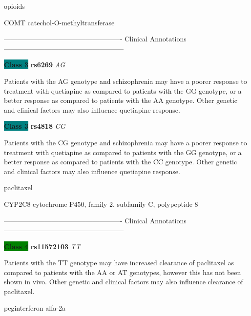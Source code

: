 \documentclass{resume} %
\begin{document}
\begin{rSection}{ opioids }
\begin{rSubsection}{ COMT }{ catechol-O-methyltransferase }{}{}
\item[] ---------------------------------------------------- Clinical Annotations -----------------------------------------------------\newline
\item \textbf{\colorbox{teal} {Class 3}} \textbf{ rs6269 } \textit{ AG }
\item[] Patients with the AG genotype and schizophrenia may have a poorer response to treatment with quetiapine as compared to patients with the GG genotype, or a better response as compared to patients with the AA genotype. Other genetic and clinical factors may also influence quetiapine response. \item \textbf{\colorbox{teal} {Class 3}} \textbf{ rs4818 } \textit{ CG }
\item[] Patients with the CG genotype and schizophrenia may have a poorer response to treatment with quetiapine as compared to patients with the GG genotype, or a better response as compared to patients with the CC genotype. Other genetic and clinical factors may also influence quetiapine response. 
\end{rSubsection}

\end{rSection}\begin{rSection}{ paclitaxel }
\item[]

\begin{rSubsection}{ CYP2C8 }{ cytochrome P450, family 2, subfamily C, polypeptide 8 }{}{}
\item[]

\item[] ---------------------------------------------------- Clinical Annotations -----------------------------------------------------\newline
\item \textbf{\colorbox{green} {Class 4}} \textbf{ rs11572103 } \textit{ TT }
\item[] Patients with the TT genotype may have increased clearance of paclitaxel as compared to patients with the AA or AT genotypes, however this has not been shown in vivo. Other genetic and clinical factors may also influence clearance of paclitaxel.
\end{rSubsection}

\end{rSection}\begin{rSection}{ peginterferon alfa-2a }
\item[]


\end{rSection}
\end{document}
